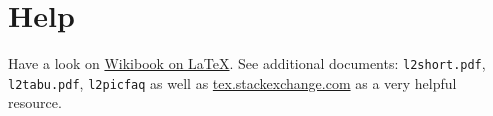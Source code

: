 \documentclass[a4paper,fontsize=12pt,toc=bib]{scrartcl}
\begin{document}
\section{Help}

Have a look on \href{https://en.wikibooks.org/wiki/LaTeX/}{Wikibook on \LaTeX}. See additional documents: \texttt{l2short.pdf}, \texttt{l2tabu.pdf}, \texttt{l2picfaq} as well as \url{tex.stackexchange.com} as a very helpful resource.


\label{LastPageBeforeRefs}
\clearpage
\ofoot{\vspace{-0.1cm}\textbf{\large\thepage}/\textbf{\large\pageref{LastBibPage}}}
\printbibliography
\label{LastBibPage}
\end{document}
